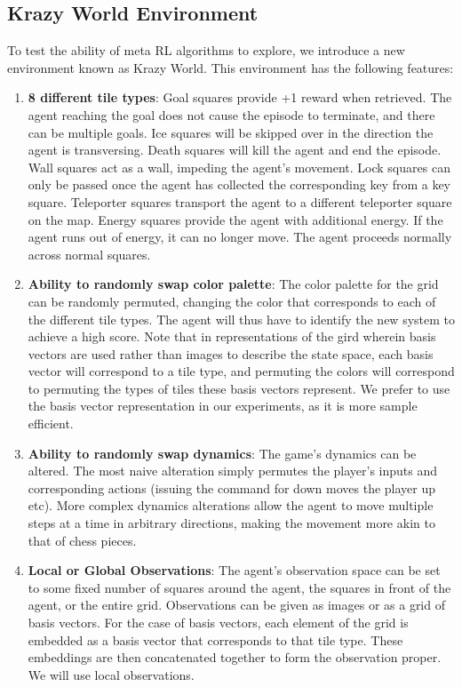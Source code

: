 \documentclass{article} %
\begin{document}
\subsection{Krazy World Environment} 
To test the ability of meta RL algorithms to explore, we introduce a new environment known as Krazy World. This environment has the following features: 
\begin{enumerate}
    \item \textbf{8 different tile types}: Goal squares provide +1 reward when retrieved. The agent reaching the goal does not cause the episode to terminate, and there can be multiple goals. Ice squares will be skipped over in the direction the agent is transversing. Death squares will kill the agent and end the episode. Wall squares act as a wall, impeding the agent's movement. Lock squares can only be passed once the agent has collected the corresponding key from a key square. Teleporter squares transport the agent to a different teleporter square on the map. Energy squares provide the agent with additional energy. If the agent runs out of energy, it can no longer move. The agent proceeds normally across normal squares. 
    \item \textbf{Ability to randomly swap color palette}: The color palette for the grid can be randomly permuted, changing the color that corresponds to each of the different tile types. The agent will thus have to identify the new system to achieve a high score. Note that in representations of the gird wherein basis vectors are used rather than images to describe the state space, each basis vector will correspond to a tile type, and permuting the colors will correspond to permuting the types of tiles these basis vectors represent. We prefer to use the basis vector representation in our experiments, as it is more sample efficient.
    \item \textbf{Ability to randomly swap dynamics}: The game's dynamics can be altered. The most naive alteration simply permutes the player's inputs and corresponding actions (issuing the command for down moves the player up etc). More complex dynamics alterations allow the agent to move multiple steps at a time in arbitrary directions, making the movement more akin to that of chess pieces. 
    \item \textbf{Local or Global Observations}: The agent's observation space can be set to some fixed number of squares around the agent, the squares in front of the agent, or the entire grid. Observations can be given as images or as a grid of basis vectors. For the case of basis vectors, each element of the grid is embedded as a basis vector that corresponds to that tile type. These embeddings are then concatenated together to form the observation proper.  We will use local observations. 
    \end{enumerate}
    
\end{document}
